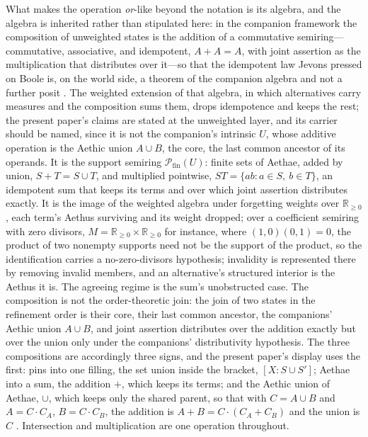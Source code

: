 \documentclass[11pt]{article}
\begin{document}
What makes the operation \emph{or}-like beyond the notation is its algebra, and the algebra is inherited rather than stipulated here: in the companion framework the composition of unweighted states is the addition of a commutative semiring---commutative, associative, and idempotent, $A + A = A$, with joint assertion as the multiplication that distributes over it---so that the idempotent law Jevons pressed on Boole is, on the world side, a theorem of the companion algebra and not a further posit \parencite{AethusTree}. The weighted extension of that algebra, in which alternatives carry measures and the composition sums them, drops idempotence and keeps the rest; the present paper's claims are stated at the unweighted layer, and its carrier should be named, since it is not the companion's intrinsic $U$, whose additive operation is the Aethic union $A \cup B$, the core, the last common ancestor of its operands. It is the support semiring $\mathcal{P}_{\mathrm{fin}}(U)$: finite sets of Aethae, added by union, $S + T = S \cup T$, and multiplied pointwise, $ST = \{ab : a \in S,\ b \in T\}$, an idempotent sum that keeps its terms and over which joint assertion distributes exactly. It is the image of the weighted algebra under forgetting weights over $\mathbb{R}_{\ge 0}$, each term's Aethus surviving and its weight dropped; over a coefficient semiring with zero divisors, $M = \mathbb{R}_{\ge 0} \times \mathbb{R}_{\ge 0}$ for instance, where $(1, 0)(0, 1) = 0$, the product of two nonempty supports need not be the support of the product, so the identification carries a no-zero-divisors hypothesis; invalidity is represented there by removing invalid members, and an alternative's structured interior is the Aethus it is. The agreeing regime is the sum's unobstructed case. The composition is not the order-theoretic join: the join of two states in the refinement order is their core, their last common ancestor, the companions' Aethic union $A \cup B$, and joint assertion distributes over the addition exactly but over the union only under the companions' distributivity hypothesis. The three compositions are accordingly three signs, and the present paper's display uses the first: pins into one filling, the set union inside the bracket, $[X : S \cup S']$; Aethae into a sum, the addition $+$, which keeps its terms; and the Aethic union of Aethae, $\cup$, which keeps only the shared parent, so that with $C = A \cup B$ and $A = C \cdot C_A$, $B = C \cdot C_B$, the addition is $A + B = C \cdot (C_A + C_B)$ and the union is $C$ \parencite{Aethus, AethusTree}. Intersection and multiplication are one operation throughout.
\end{document}
